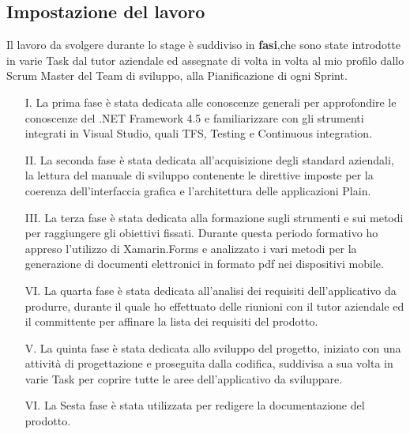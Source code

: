\subsection{Impostazione del lavoro}
Il lavoro da svolgere durante lo stage è suddiviso in \textbf{fasi},che sono state introdotte in varie Task dal tutor aziendale ed assegnate di volta in volta al mio profilo dallo Scrum Master del Team di sviluppo, alla Pianificazione di ogni Sprint.
\begin{itemize}
	\item[I.] La prima fase è stata dedicata alle conoscenze generali per approfondire le conoscenze del .NET Framework 4.5 e familiarizzare con gli strumenti integrati in Visual Studio, quali TFS, Testing e Continuous integration.
	\item[II.] La seconda fase è stata dedicata all'acquisizione degli standard aziendali, la lettura del manuale di sviluppo contenente le direttive imposte per la coerenza dell'interfaccia grafica e l'architettura delle applicazioni Plain.
	\item[III.] La terza fase è stata dedicata alla formazione sugli strumenti e sui metodi per raggiungere gli obiettivi fissati. Durante questa periodo formativo ho appreso l'utilizzo di Xamarin.Forms e analizzato i vari metodi per la generazione di documenti elettronici in formato pdf nei dispositivi mobile.
	\item[VI.] La quarta fase è stata dedicata all'analisi dei requisiti dell'applicativo da produrre, durante il quale ho effettuato delle riunioni con il tutor aziendale ed il committente per affinare la lista dei requisiti del prodotto.
	\item[V.] La quinta fase è stata dedicata allo sviluppo del progetto, iniziato con una attività di progettazione e proseguita dalla codifica, suddivisa a sua volta in varie Task per coprire tutte le aree dell'applicativo da sviluppare. 
	\item[VI.] La Sesta fase è stata utilizzata per redigere la documentazione del prodotto.
\end{itemize}









